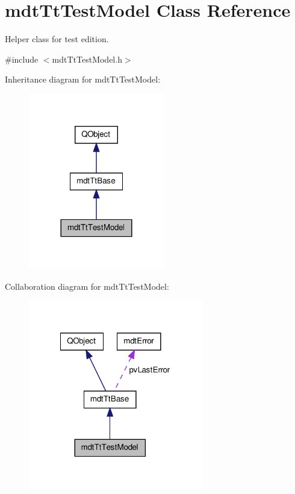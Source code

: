 \hypertarget{classmdt_tt_test_model}{\section{mdt\-Tt\-Test\-Model Class Reference}
\label{classmdt_tt_test_model}
}


Helper class for test edition.  




{\ttfamily \#include $<$mdt\-Tt\-Test\-Model.\-h$>$}



Inheritance diagram for mdt\-Tt\-Test\-Model\-:\nopagebreak
\begin{figure}[H]
\begin{center}
\leavevmode
\includegraphics[width=168pt]{classmdt_tt_test_model__inherit__graph}
\end{center}
\end{figure}


Collaboration diagram for mdt\-Tt\-Test\-Model\-:\nopagebreak
\begin{figure}[H]
\begin{center}
\leavevmode
\includegraphics[width=216pt]{classmdt_tt_test_model__coll__graph}
\end{center}
\end{figure}
